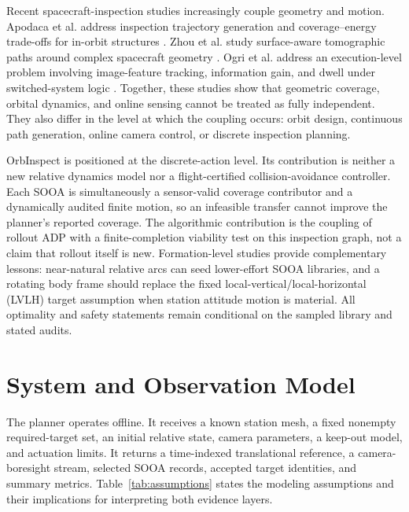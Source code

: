 \documentclass{IEEEtaes}
\theoremstyle{remark}
\theoremstyle{plain}
\begin{document}
Recent spacecraft-inspection studies increasingly couple geometry and motion. Apodaca et al. address inspection trajectory generation and coverage--energy trade-offs for in-orbit structures \cite{apodaca2025trajectory}. Zhou et al. study surface-aware tomographic paths around complex spacecraft geometry \cite{zhou2026tomographic}. Ogri et al. address an execution-level problem involving image-feature tracking, information gain, and dwell under switched-system logic \cite{ogri2025switched}. Together, these studies show that geometric coverage, orbital dynamics, and online sensing cannot be treated as fully independent. They also differ in the level at which the coupling occurs: orbit design, continuous path generation, online camera control, or discrete inspection planning.

OrbInspect is positioned at the discrete-action level. Its contribution is neither a new relative dynamics model nor a flight-certified collision-avoidance controller. Each SOOA is simultaneously a sensor-valid coverage contributor and a dynamically audited finite motion, so an infeasible transfer cannot improve the planner's reported coverage. The algorithmic contribution is the coupling of rollout ADP with a finite-completion viability test on this inspection graph, not a claim that rollout itself is new. Formation-level studies provide complementary lessons: near-natural relative arcs can seed lower-effort SOOA libraries, and a rotating body frame should replace the fixed local-vertical/local-horizontal (LVLH) target assumption when station attitude motion is material. All optimality and safety statements remain conditional on the sampled library and stated audits.

\section{System and Observation Model}
\label{sec:system}

The planner operates offline. It receives a known station mesh, a fixed nonempty required-target set, an initial relative state, camera parameters, a keep-out model, and actuation limits. It returns a time-indexed translational reference, a camera-boresight stream, selected SOOA records, accepted target identities, and summary metrics. Table~\ref{tab:assumptions} states the modeling assumptions and their implications for interpreting both evidence layers.
\end{document}
